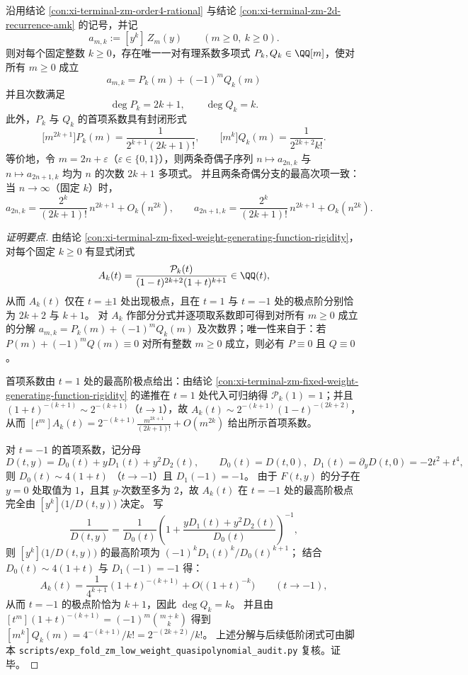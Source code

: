 \begin{conclusion}\label{con:xi-terminal-zm-fixed-weight-quasipolynomial}
沿用结论 \ref{con:xi-terminal-zm-order4-rational} 与结论 \ref{con:xi-terminal-zm-2d-recurrence-amk} 的记号，并记
\[
a_{m,k}:=[y^k]\,Z_m(y)\qquad(m\ge 0,\ k\ge 0).
\]
则对每个固定整数 \(k\ge 0\)，存在唯一一对有理系数多项式 \(P_k,Q_k\in\QQ[m]\)，使对所有 \(m\ge 0\) 成立
\[
\boxed{\;a_{m,k}=P_k(m)+(-1)^m Q_k(m)\;}
\]
并且次数满足
\[
\deg P_k=2k+1,\qquad \deg Q_k=k.
\]
此外，\(P_k\) 与 \(Q_k\) 的首项系数具有封闭形式
\[
\bigl[m^{2k+1}\bigr]P_k(m)=\frac{1}{2^{k+1}(2k+1)!},
\qquad
\bigl[m^{k}\bigr]Q_k(m)=\frac{1}{2^{2k+2}k!}.
\]
等价地，令 \(m=2n+\varepsilon\)（\(\varepsilon\in\{0,1\}\)），则两条奇偶子序列 \(n\mapsto a_{2n,k}\) 与 \(n\mapsto a_{2n+1,k}\) 均为 \(n\) 的次数 \(2k+1\) 多项式。
并且两条奇偶分支的最高次项一致：当 \(n\to\infty\)（固定 \(k\)）时，
\[
a_{2n,k}=\frac{2^k}{(2k+1)!}\,n^{2k+1}+O_k(n^{2k}),
\qquad
a_{2n+1,k}=\frac{2^k}{(2k+1)!}\,n^{2k+1}+O_k(n^{2k}).
\]
\end{conclusion}
\begin{proof}[证明要点]
由结论 \ref{con:xi-terminal-zm-fixed-weight-generating-function-rigidity}，
对每个固定 \(k\ge 0\) 有显式闭式
\[
A_k(t)=\frac{\mathcal{P}_k(t)}{(1-t)^{2k+2}(1+t)^{k+1}}\in\QQ(t),
\]
从而 \(A_k(t)\) 仅在 \(t=\pm 1\) 处出现极点，且在 \(t=1\) 与 \(t=-1\) 处的极点阶分别恰为 \(2k+2\) 与 \(k+1\)。
对 \(A_k\) 作部分分式并逐项取系数即可得到对所有 \(m\ge 0\) 成立的分解
\(
a_{m,k}=P_k(m)+(-1)^mQ_k(m)
\)
及次数界；唯一性来自于：若 \(P(m)+(-1)^mQ(m)\equiv 0\) 对所有整数 \(m\ge 0\) 成立，则必有 \(P\equiv 0\) 且 \(Q\equiv 0\)。
\par
首项系数由 \(t=1\) 处的最高阶极点给出：由结论 \ref{con:xi-terminal-zm-fixed-weight-generating-function-rigidity} 的递推在 \(t=1\) 处代入可归纳得 \(\mathcal{P}_k(1)=1\)；并且 \((1+t)^{-(k+1)}\sim 2^{-(k+1)}\)（\(t\to 1\)），故
\(
A_k(t)\sim 2^{-(k+1)}(1-t)^{-(2k+2)}
\)，从而
\(
[t^m]A_k(t)=2^{-(k+1)}\frac{m^{2k+1}}{(2k+1)!}+O(m^{2k})
\)
给出所示首项系数。
\par
对 \(t=-1\) 的首项系数，记分母
\[
D(t,y)=D_0(t)+yD_1(t)+y^2D_2(t),
\qquad
D_0(t)=D(t,0),\ \ D_1(t)=\partial_y D(t,0)=-2t^2+t^4,
\]
则
\(
D_0(t)\sim 4(1+t)
\)
（\(t\to-1\)）且 \(D_1(-1)=-1\)。
由于 \(F(t,y)\) 的分子在 \(y=0\) 处取值为 \(1\)，且其 \(y\)-次数至多为 \(2\)，故 \(A_k(t)\) 在 \(t=-1\) 处的最高阶极点完全由 \([y^k]\bigl(1/D(t,y)\bigr)\) 决定。
写
\[
\frac{1}{D(t,y)}=\frac{1}{D_0(t)}
\left(1+\frac{yD_1(t)+y^2D_2(t)}{D_0(t)}\right)^{-1},
\]
则 \([y^k]\bigl(1/D(t,y)\bigr)\) 的最高阶项为 \((-1)^kD_1(t)^k/D_0(t)^{k+1}\)；
结合 \(D_0(t)\sim 4(1+t)\) 与 \(D_1(-1)=-1\) 得：
\[
A_k(t)=\frac{1}{4^{k+1}}(1+t)^{-(k+1)}+O\!\bigl((1+t)^{-k}\bigr)\qquad(t\to-1),
\]
从而 \(t=-1\) 的极点阶恰为 \(k+1\)，因此 \(\deg Q_k=k\)。
并且由
\(
[t^m](1+t)^{-(k+1)}=(-1)^m\binom{m+k}{k}
\)
得到
\(
[m^k]Q_k(m)=4^{-(k+1)}/k!=2^{-(2k+2)}/k!
\)。
上述分解与后续低阶闭式可由脚本 \texttt{scripts/exp\_fold\_zm\_low\_weight\_quasipolynomial\_audit.py} 复核。证毕。
\end{proof}

